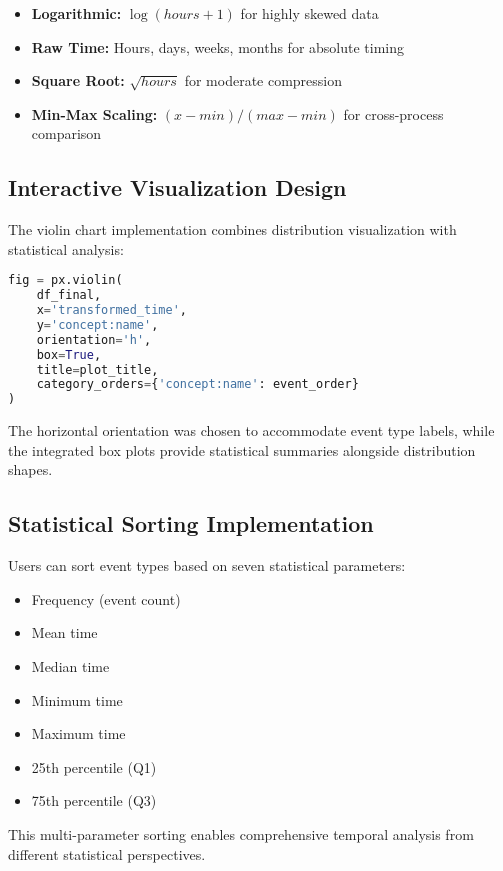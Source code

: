 \documentclass[11pt,a4paper]{article}
\begin{document}
\begin{itemize}
    \item \textbf{Logarithmic:} $\log(hours + 1)$ for highly skewed data
    \item \textbf{Raw Time:} Hours, days, weeks, months for absolute timing
    \item \textbf{Square Root:} $\sqrt{hours}$ for moderate compression
    \item \textbf{Min-Max Scaling:} $(x - min) / (max - min)$ for cross-process comparison
\end{itemize}

\subsection{Interactive Visualization Design}

The violin chart implementation combines distribution visualization with statistical analysis:

\begin{lstlisting}[language=Python, caption=Violin Chart Generation]
fig = px.violin(
    df_final, 
    x='transformed_time', 
    y='concept:name',
    orientation='h',
    box=True,
    title=plot_title,
    category_orders={'concept:name': event_order}
)
\end{lstlisting}

The horizontal orientation was chosen to accommodate event type labels, while the integrated box plots provide statistical summaries alongside distribution shapes.

\subsection{Statistical Sorting Implementation}

Users can sort event types based on seven statistical parameters:

\begin{itemize}
    \item Frequency (event count)
    \item Mean time
    \item Median time
    \item Minimum time
    \item Maximum time
    \item 25th percentile (Q1)
    \item 75th percentile (Q3)
\end{itemize}

This multi-parameter sorting enables comprehensive temporal analysis from different statistical perspectives.
\end{document}

